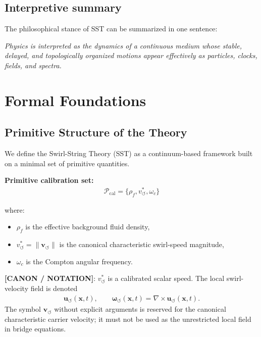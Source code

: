 \documentclass[11pt]{article}
\theoremstyle{definition}
\theoremstyle{plain}
\theoremstyle{remark}
\newcommand{\rhoF}{{\rho_{\!f}}}
\newcommand{\vchar}{v_{\!\boldsymbol{\circlearrowleft}}^{\ast}}
\newcommand{\uswirl}{\mathbf{u}_{\!\boldsymbol{\circlearrowleft}}}
\newcommand{\omegaswirl}{\boldsymbol{\omega}_{\!\boldsymbol{\circlearrowleft}}}
\begin{document}
    \subsection{Interpretive summary}
        The philosophical stance of SST can be summarized in one sentence:
        \begin{center}
            \textit{Physics is interpreted as the dynamics of a continuous medium whose stable, delayed, and topologically organized motions appear effectively as particles, clocks, fields, and spectra.}
        \end{center}

\section{Formal Foundations}
    \label{sec:foundations}
    
    \subsection{Primitive Structure of the Theory}
        
        We define the Swirl-String Theory (SST) as a continuum-based framework built on a minimal set of primitive quantities.
        
        \textbf{Primitive calibration set:}
        \begin{align}
            \mathcal{P}_{\mathrm{cal}} = \{ \rhoF, \vchar, \omega_c \}
        \end{align}
        
        where:
        \begin{itemize}
            \item $\rhoF$ is the effective background fluid density,
            \item $\vchar=\lVert\mathbf{v}_{\!\boldsymbol{\circlearrowleft}}\rVert$ is the canonical characteristic swirl-speed magnitude,
            \item $\omega_c$ is the Compton angular frequency.
        \end{itemize}

        \textbf{[CANON / NOTATION]}: $\vchar$ is a calibrated scalar speed. The local swirl-velocity field is denoted
        \begin{align}
            \uswirl(\mathbf{x},t),
            \qquad
            \omegaswirl(\mathbf{x},t)=\nabla\times\uswirl(\mathbf{x},t).
        \end{align}
        The symbol $\mathbf{v}_{\!\boldsymbol{\circlearrowleft}}$ without explicit arguments is reserved for the canonical characteristic carrier velocity; it must not be used as the unrestricted local field in bridge equations.
        
\end{document}
